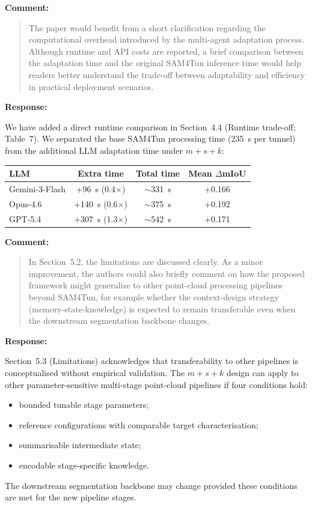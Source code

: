 \documentclass[11pt,a4paper]{article}
\newenvironment{commentblock}{%
  \par\smallskip\noindent\textbf{Comment:}\par
  \begin{quote}\itshape\color{black}
}{%
  \end{quote}\smallskip
}
\newenvironment{responseblock}{%
  \par\smallskip\noindent\textbf{Response:}\par
  \begingroup\color{responsegreen}
}{%
  \endgroup\smallskip
}
\begin{document}
\begin{commentblock}
The paper would benefit from a short clarification regarding the computational overhead introduced by the multi-agent adaptation process. Although runtime and API costs are reported, a brief comparison between the adaptation time and the original SAM4Tun inference time would help readers better understand the trade-off between adaptability and efficiency in practical deployment scenarios.
\end{commentblock}
\begin{responseblock}
We have added a direct runtime comparison in Section~4.4 (Runtime trade-off; Table~7). We separated the base SAM4Tun processing time (235~s per tunnel) from the additional LLM adaptation time under $m+s+k$:

\begin{table}[h]
  \centering
  \small
  \begin{tabular}{@{}lccc@{}}
    \toprule
    LLM & Extra time & Total time & Mean $\Delta$mIoU \\
    \midrule
    Gemini-3-Flash & +96~s (0.4$\times$)  & $\sim$331~s & +0.166 \\
    Opus-4.6       & +140~s (0.6$\times$) & $\sim$375~s & +0.192 \\
    GPT-5.4        & +307~s (1.3$\times$) & $\sim$542~s & +0.171 \\
    \bottomrule
  \end{tabular}
\end{table}
\end{responseblock}

\begin{commentblock}
In Section~5.2, the limitations are discussed clearly. As a minor improvement, the authors could also briefly comment on how the proposed framework might generalize to other point-cloud processing pipelines beyond SAM4Tun, for example whether the context-design strategy (memory-state-knowledge) is expected to remain transferable even when the downstream segmentation backbone changes.
\end{commentblock}
\begin{responseblock}
Section~5.3 (Limitations) acknowledges that transferability to other pipelines is conceptualised without empirical validation. The $m+s+k$ design can apply to other parameter-sensitive multi-stage point-cloud pipelines if four conditions hold:
\begin{itemize}[nosep]
  \item bounded tunable stage parameters;
  \item reference configurations with comparable target characterisation;
  \item summarisable intermediate state;
  \item encodable stage-specific knowledge.
\end{itemize}
The downstream segmentation backbone may change provided these conditions are met for the new pipeline stages.
\end{responseblock}
\end{document}
